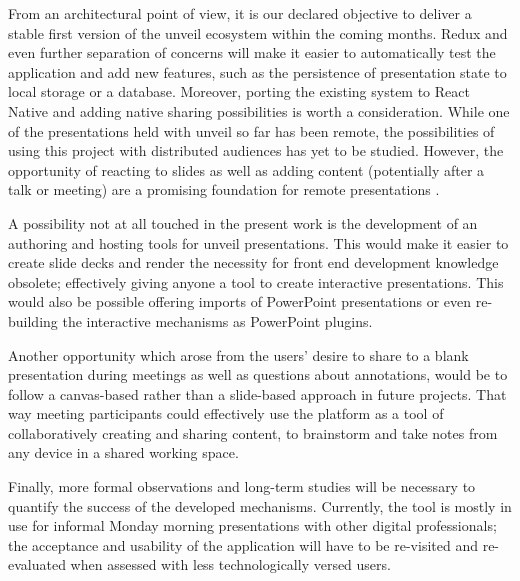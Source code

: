 From an architectural point of view, it is our declared objective to deliver a stable first version of the unveil ecosystem within the coming months. Redux and even further separation of concerns will make it easier to automatically test the application and add new features, such as the persistence of presentation state to local storage or a database. Moreover, porting the existing system to React Native and adding native sharing possibilities is worth a consideration.
While one of the presentations held with unveil so far has been remote, the possibilities of using this project with distributed audiences has yet to be studied. However, the opportunity of reacting to slides as well as adding content (potentially after a talk or meeting) are a promising foundation for remote presentations \cite{Isaacs:InteractivePresentationsDistributedAudience, Cheng:TreebasedOnlinePresentations}.

A possibility not at all touched in the present work is the development of an authoring and hosting tools for unveil presentations. This would make it easier to create slide decks and render the necessity for front end development knowledge obsolete; effectively giving anyone a tool to create interactive presentations. This would also be possible offering imports of PowerPoint presentations or even re-building the interactive mechanisms as PowerPoint plugins.

Another opportunity which arose from the users' desire to share to a blank presentation during meetings as well as questions about annotations, would be to follow a canvas-based rather than a slide-based approach in future projects. That way meeting participants could effectively use the platform as a tool of collaboratively creating and sharing content, to brainstorm and take notes from any device in a shared working space.

Finally, more formal observations and long-term studies will be necessary to quantify the success of the developed mechanisms. Currently, the tool is mostly in use for informal Monday morning presentations with other digital professionals; the acceptance and usability of the application will have to be re-visited and re-evaluated when assessed with less technologically versed users.